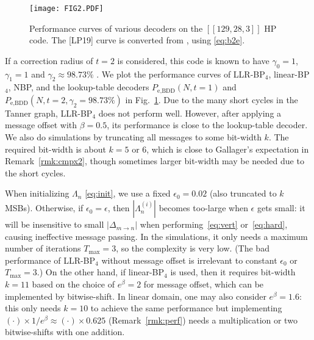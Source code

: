 \documentclass{ieeeaccess}
\theoremstyle{definition}		%
\begin{document}
\begin{figure} 
	\centering \texttt{[image: FIG2.PDF]}
	\caption{Performance curves of various decoders on the $[[129,28,3]]$ HP code. The [LP19] curve  is converted from \cite{LP19}, using \eqref{eq:b2e}.
	} \label{fig:hp}
\end{figure}

If a correction radius of $t=2$ is considered, this code is known to have $\gamma_0=1$, $\gamma_1=1$ and $\gamma_2\approx 98.73\%$ \cite{KCL21}.
We plot the performance curves of \mbox{LLR-BP$_4$}, \mbox{linear-BP$_4$}, NBP, and the lookup-table decoders $P_\text{e,BDD}(N,t=1)$ and $P_\text{e,BDD}(N,t=2,\gamma_2=98.73\%)$ in Fig.~\ref{fig:hp}. %
Due to the many short cycles in the Tanner graph, LLR-BP$_4$ does not perform well. 
However, after applying a message offset with $\beta=0.5$, its performance is close to the lookup-table decoder.
We also do simulations by truncating all messages to some bit-width $k$.
The required bit-width is about $k=5$ or $6$,  which is close to Gallager's expectation in Remark~\ref{rmk:cmpx2}, though sometimes larger bit-width may be needed due to the short cycles. 


When initializing $\Lambda_n$ \eqref{eq:init}, we use a fixed ${\epsilon_0=0.02}$ (also truncated to $k$ MSBs). 
Otherwise,  if ${\epsilon_0=\epsilon}$, then $|\Lambda_n^{(i)}|$ becomes too-large when $\epsilon$ gets small: 
it will be insensitive to small $|\Delta_{m\to n}|$ when performing~\eqref{eq:vert} or~\eqref{eq:hard}, causing ineffective message passing.
In the simulations, it only needs a maximum number of iterations $T_{\max}=3$, so the complexity is very low.
(The bad performance of LLR-BP$_4$ without message offset is irrelevant to constant $\epsilon_0$ or $T_{\max}=3$.)
On the other hand, if linear-BP$_4$ is used, then it requires bit-width $k=11$ based on the choice of $e^\beta = 2$ for message offset, which can be implemented by bitwise-shift.
	In linear domain, one may also consider  $e^\beta = 1.6$: this only needs $k=10$ to achieve the same performance but implementing $(\cdot)\times 1/e^\beta \approx (\cdot)\times 0.625$ (Remark~\ref{rmk:perf}) needs a multiplication or two bitwise-shifts with one addition.
\end{document}
